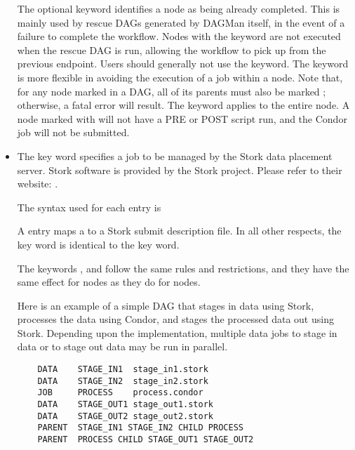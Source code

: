 \begin{itemize}
The optional  keyword identifies a node as being already
completed.
This is mainly used by rescue DAGs generated by DAGMan itself,
in the event of a failure to complete the workflow.
Nodes with the  keyword are not executed when the rescue DAG is run,
allowing the workflow to pick up from the previous endpoint.  Users
should generally not use the  keyword.
The  keyword is more flexible in avoiding
the execution of a job within a node.
Note that, for any node marked  in a DAG, all of
its parents must also be marked ; 
otherwise, a fatal error will result.
The  keyword applies to the entire node.
A node marked with  will not have a PRE or POST script run,
and the Condor job will not be submitted.

\label{dagman:DATA}
\item {}

The  key word specifies a job to be managed by the Stork data
placement server.  
Stork software is provided by the Stork project.
Please refer to their website: 
.

The syntax used for each  entry is

  
  

A  entry maps a  to a Stork submit description file.
In all other respects, the  key word is identical to the
 key word.

The keywords ,  and  
follow the same rules and restrictions, and they have the same effect
for  nodes as they do for  nodes.

Here is an example of a simple DAG that stages in data using Stork,
processes the data using Condor, 
and stages the processed data out using Stork.
Depending upon the implementation, multiple data jobs to stage in data
or to stage out data
may be run in parallel.

\footnotesize
\begin{verbatim}
    DATA    STAGE_IN1  stage_in1.stork
    DATA    STAGE_IN2  stage_in2.stork
    JOB     PROCESS    process.condor 
    DATA    STAGE_OUT1 stage_out1.stork
    DATA    STAGE_OUT2 stage_out2.stork
    PARENT  STAGE_IN1 STAGE_IN2 CHILD PROCESS
    PARENT  PROCESS CHILD STAGE_OUT1 STAGE_OUT2
\end{verbatim}
\normalsize


\end{itemize}
